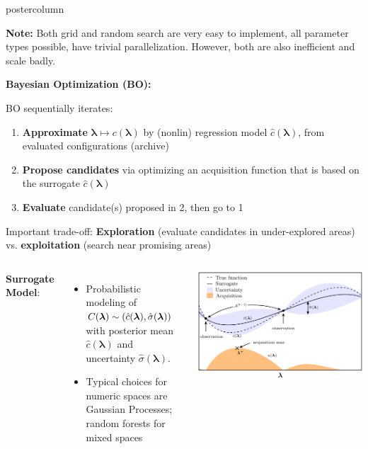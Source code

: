 \documentclass{beamer}
\begin{document}
\begin{frame}[fragile]{}
\begin{columns}
\begin{column}{.31\textwidth}
\begin{beamercolorbox}[center]{postercolumn}
\begin{minipage}{.98\textwidth}
{\begin{myblock}{ }
  \textbf{Note:} Both grid and random search are very easy to implement, all parameter types possible, have trivial parallelization. However, both are also inefficient and scale badly.
  
  \begin{codebox}
    \textbf{Bayesian Optimization (BO):}
    \end{codebox}   
    BO sequentially iterates:
    \begin{enumerate}
      \setlength{\itemindent}{+.3in}
\item \textbf{Approximate} $\bm{\lambda} \mapsto c(\bm{\lambda})$ by (nonlin) regression model $\hat c(\bm{\lambda})$, from evaluated configurations (archive)
\item \textbf{Propose candidates} via optimizing an acquisition function that is based on the surrogate $\hat c(\bm{\lambda})$
\item \textbf{Evaluate} candidate(s) proposed in 2, then go to 1 
\end{enumerate}

Important trade-off: \textbf{Exploration} (evaluate candidates in under-explored areas) vs. \textbf{exploitation} (search near promising areas)

\hspace*{1ex}

\begin{columns}
  \textbf{Surrogate Model}: 
  \begin{itemize}[$\bullet$]
    \setlength{\itemindent}{+.3in}
      \item Probabilistic modeling of $C(\bm{\lambda}) \sim (\hat c(\bm{\lambda}), \hat \sigma(\bm{\lambda}))$ with posterior mean $\hat c(\bm{\lambda})$ and uncertainty  $\hat \sigma(\bm{\lambda})$.  
      \item Typical choices for numeric spaces are Gaussian Processes; random forests for mixed spaces
  \end{itemize}
  \vspace*{0.5cm}
  \includegraphics[width = 1\textwidth]{img/mbo.png}
  \end{columns}
  

\end{myblock}}
\end{minipage}
\end{beamercolorbox}
\end{column}
\end{columns}
\end{frame}
\end{document}

